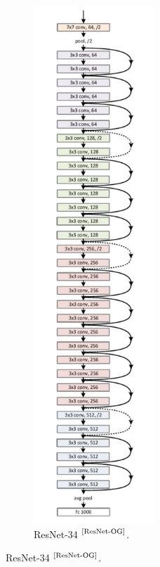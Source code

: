 \documentclass[
11pt, %
english, %
singlespacing, %
headsepline, %
]{project_structure}
\begin{document}
\begin{figure}[H]
\begin{subfigure}[b]{0.4\textwidth}
         \label{fig:ResNet-18}
     \end{subfigure}
     \hfill
     \begin{subfigure}[b]{0.4\textwidth}
         \centering
         \includegraphics[width=0.5\textwidth]{figures/background/ResNet34.png}
         \caption{\acrshort{ResNet}-34 $^{\text{\cite{ResNet-OG}}}$.}
         \label{fig:ResNet-34}
     \end{subfigure}
\end{figure}
\end{document}
